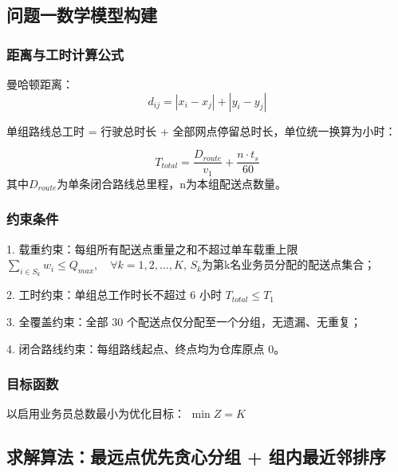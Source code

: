 \documentclass[withoutpreface,bwprint]{cumcmthesis} %
\begin{document}
\subsection{问题一数学模型构建}

\subsubsection{距离与工时计算公式}
曼哈顿距离：
\begin{equation}
d_{ij}=|x_i-x_j|+|y_i-y_j|
\label{eq:energy}
\end{equation}

单组路线总工时 = 行驶总时长 + 全部网点停留总时长，单位统一换算为小时：

\begin{equation}
T_{total}=\frac{D_{route}}{v_1}+\frac{n \cdot t_s}{60}
\label{eq:energy}
\end{equation}
其中\(D_{route}\)为单条闭合路线总里程，n为本组配送点数量。

\subsubsection{约束条件}
1.	载重约束：每组所有配送点重量之和不超过单车载重上限
\(\sum_{i \in S_k} w_i \le Q_{max}, \quad \forall k=1,2,...,K\),
\(S_k\)为第k名业务员分配的配送点集合；

\par2. 工时约束：单组总工作时长不超过 6 小时
\(T_{total} \le T_1\)

\par3. 全覆盖约束：全部 30 个配送点仅分配至一个分组，无遗漏、无重复；
\par4. 闭合路线约束：每组路线起点、终点均为仓库原点 0。

\subsubsection{目标函数}
以启用业务员总数最小为优化目标：
\(\min Z = K\)

\subsection{求解算法：最远点优先贪心分组 + 组内最近邻排序}
\end{document}
